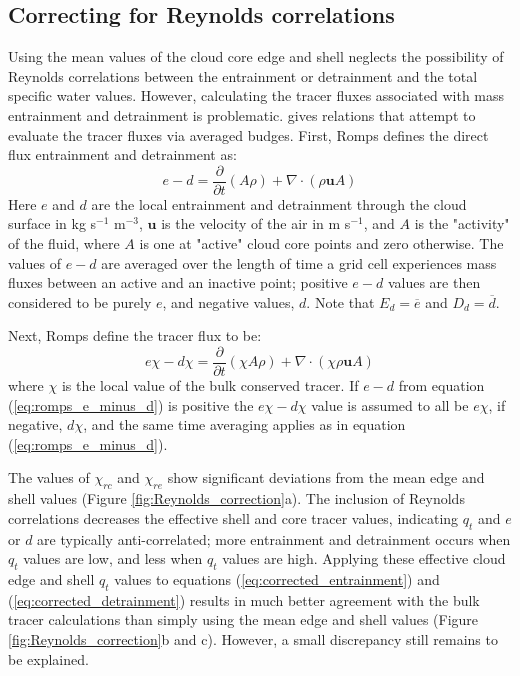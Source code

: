 \documentclass[draft,grl]{agutex}
\begin{document}
\begin{article}
\section{Correcting for Reynolds correlations}

Using the mean values of the cloud core edge and shell neglects the possibility 
of Reynolds correlations between the entrainment or detrainment and the total 
specific water values.  However, calculating the tracer fluxes associated with 
mass entrainment and detrainment is problematic.  \cite{Romps2010} gives 
relations that attempt to evaluate the tracer fluxes via averaged budges.  
First, Romps defines the direct flux entrainment and detrainment as:
\begin{equation}
  \label{eq:romps_e_minus_d}
  e - d = \frac{\partial}{\partial t}(A\rho) 
        + \nabla \cdot (\rho \mathbf{u} A) 
\end{equation}
Here $e$ and $d$ are the local entrainment and detrainment through the cloud 
surface in kg s$^{-1}$ m$^{-3}$, $\mathbf{u}$ is the velocity of the air in 
m s$^{-1}$, and $A$ is the "activity" of the fluid, where $A$ is one at "active" 
cloud core points and zero otherwise.  The values of $e - d$ are averaged 
over the length of time a grid cell experiences mass fluxes between an active 
and an inactive point; positive $e-d$ values are then considered to be purely 
$e$, and negative values, $d$.  Note that $E_d = \overline{e}$ and 
$D_d = \overline{d}$.

Next, Romps define the tracer flux to be:
\begin{equation}
  \label{eq:romps_echi_minus_dchi}
  e\chi - d\chi = \frac{\partial}{\partial t}(\chi A \rho) 
                + \nabla \cdot (\chi \rho \mathbf{u} A) 
\end{equation}
where $\chi$ is the local value of the bulk conserved tracer.  If $e-d$ from 
equation (\ref{eq:romps_e_minus_d}) is positive the $e\chi - d\chi$ value is 
assumed to all be $e\chi$, if negative, $d\chi$, and the same time 
averaging applies as in equation (\ref{eq:romps_e_minus_d}).  



The values of $\chi_{rc}$ and $\chi_{re}$ show significant deviations from 
the mean edge and shell values (Figure \ref{fig:Reynolds_correction}a).
The inclusion of Reynolds correlations decreases the effective shell and core 
tracer values, indicating $q_t$ and $e$ or $d$ are typically anti-correlated; 
more entrainment and detrainment occurs when $q_t$ values are 
low, and less when $q_t$ values are high.  Applying these effective cloud edge 
and shell $q_t$ values to equations (\ref{eq:corrected_entrainment}) and 
(\ref{eq:corrected_detrainment}) results in much better agreement with the bulk 
tracer calculations than simply using the mean edge and shell values 
(Figure \ref{fig:Reynolds_correction}b and c).  However, a small discrepancy 
still remains to be explained.


\end{article}
\end{document}
